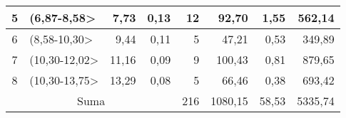 \begin{table}[H]
{\begin{tabular}{|c|l|r|r|r|r|r|r|}
5                                                                  & (6,87-8,58\textgreater{}                 & 7,73                                 & 0,13                                                 & 12                         & 92,70                                           & 1,55                                                    & 562,14                                                                \\ \hline
6                                                                  & (8,58-10,30\textgreater{}                & 9,44                                 & 0,11                                                 & 5                          & 47,21                                           & 0,53                                                    & 349,89                                                                \\ \hline
7                                                                  & (10,30-12,02\textgreater{}               & 11,16                                & 0,09                                                 & 9                          & 100,43                                          & 0,81                                                    & 879,65                                                                \\ \hline
8                                                                  & (10,30-13,75\textgreater{}               & 13,29                                & 0,08                                                 & 5                          & 66,46                                           & 0,38                                                    & 693,42                                                                \\ \hline
\multicolumn{4}{|c|}{Suma}                                                                                                                                                                                  & 216                        & 1080,15                                         & 58,53                                                   & 5335,74                                                               \\ \hline
\end{tabular}%
}
\end{table}